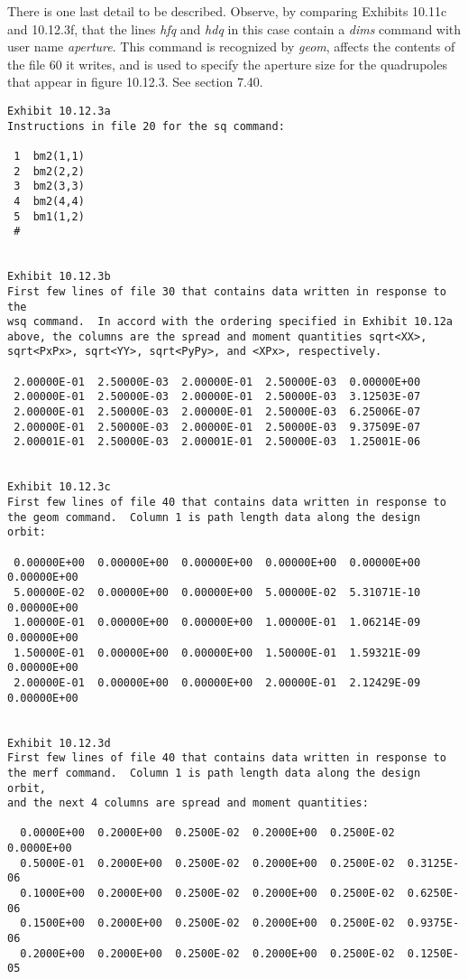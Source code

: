 There is one last detail to be described.  Observe, by comparing Exhibits
10.11c and 10.12.3f, that the lines {\em hfq} and {\em hdq} in this case contain a
{\em dims} command with user name {\em aperture}.  This command is recognized by {\em geom},
affects the contents of the file 60 it writes, and is used to specify the aperture
size for the quadrupoles that appear in figure 10.12.3.  See section 7.40.
\begin{footnotesize}
\begin{verbatim}
Exhibit 10.12.3a
Instructions in file 20 for the sq command:

 1  bm2(1,1)
 2  bm2(2,2)
 3  bm2(3,3)
 4  bm2(4,4)
 5  bm1(1,2)
 #


Exhibit 10.12.3b
First few lines of file 30 that contains data written in response to the
wsq command.  In accord with the ordering specified in Exhibit 10.12a
above, the columns are the spread and moment quantities sqrt<XX>,
sqrt<PxPx>, sqrt<YY>, sqrt<PyPy>, and <XPx>, respectively.

 2.00000E-01  2.50000E-03  2.00000E-01  2.50000E-03  0.00000E+00
 2.00000E-01  2.50000E-03  2.00000E-01  2.50000E-03  3.12503E-07
 2.00000E-01  2.50000E-03  2.00000E-01  2.50000E-03  6.25006E-07
 2.00000E-01  2.50000E-03  2.00000E-01  2.50000E-03  9.37509E-07
 2.00001E-01  2.50000E-03  2.00001E-01  2.50000E-03  1.25001E-06


Exhibit 10.12.3c
First few lines of file 40 that contains data written in response to
the geom command.  Column 1 is path length data along the design orbit:

 0.00000E+00  0.00000E+00  0.00000E+00  0.00000E+00  0.00000E+00  0.00000E+00
 5.00000E-02  0.00000E+00  0.00000E+00  5.00000E-02  5.31071E-10  0.00000E+00
 1.00000E-01  0.00000E+00  0.00000E+00  1.00000E-01  1.06214E-09  0.00000E+00
 1.50000E-01  0.00000E+00  0.00000E+00  1.50000E-01  1.59321E-09  0.00000E+00
 2.00000E-01  0.00000E+00  0.00000E+00  2.00000E-01  2.12429E-09  0.00000E+00


Exhibit 10.12.3d
First few lines of file 40 that contains data written in response to
the merf command.  Column 1 is path length data along the design orbit,
and the next 4 columns are spread and moment quantities:

  0.0000E+00  0.2000E+00  0.2500E-02  0.2000E+00  0.2500E-02  0.0000E+00
  0.5000E-01  0.2000E+00  0.2500E-02  0.2000E+00  0.2500E-02  0.3125E-06
  0.1000E+00  0.2000E+00  0.2500E-02  0.2000E+00  0.2500E-02  0.6250E-06
  0.1500E+00  0.2000E+00  0.2500E-02  0.2000E+00  0.2500E-02  0.9375E-06
  0.2000E+00  0.2000E+00  0.2500E-02  0.2000E+00  0.2500E-02  0.1250E-05



\end{verbatim}
\end{footnotesize}
